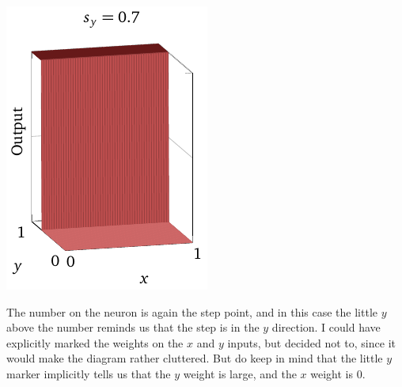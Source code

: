 \documentclass[a4paper,twoside,10pt]{book}
\begin{document}
\begin{center}
	\includegraphics[width=0.32\linewidth]{./figures/ch4/3d/stepy3}
\end{center}
The number on the neuron is again the step point, and in this case the little $y$ above the number reminds us that the step is in the $y$ direction. I could have explicitly marked the weights on the $x$ and $y$ inputs, but decided not to, since it would make the diagram rather cluttered. But do keep in mind that the little $y$ marker implicitly tells us that the $y$ weight is large, and the $x$ weight is 0.
\end{document}
